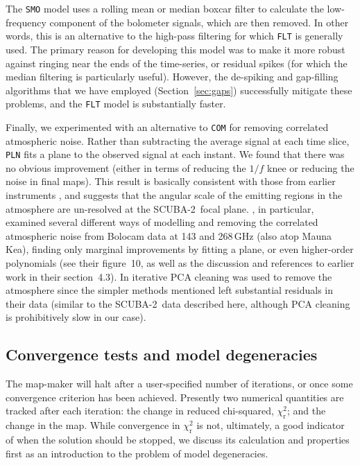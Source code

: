 \documentclass[useAMS,usenatbib,nofootinbib]{mn2e}
\newcommand{\scuba}{SCUBA-2}
\newcommand{\model}[1]{\texttt{#1}}
\begin{document}
The \model{SMO} model uses a rolling mean or median boxcar filter to
calculate the low-frequency component of the bolometer signals, which
are then removed. In other words, this is an alternative to the
high-pass filtering for which \model{FLT} is generally used. The
primary reason for developing this model was to make it more robust
against ringing near the ends of the time-series, or residual spikes
(for which the median filtering is particularly useful). However, the
de-spiking and gap-filling algorithms that we have employed
(Section~\ref{sec:gaps}) successfully mitigate these problems, and the
\model{FLT} model is substantially faster.

Finally, we experimented with an alternative to \model{COM} for
removing correlated atmospheric noise. Rather than subtracting the
average signal at each time slice, \model{PLN} fits a plane to the
observed signal at each instant. We found that there was no obvious
improvement (either in terms of reducing the $1/f$ knee or reducing
the noise in final maps). This result is basically consistent with
those from earlier instruments \citep[e.g., the prediction for \scuba\
based on SCUBA data described in][]{chapin2002}, and suggests that the
angular scale of the emitting regions in the atmosphere are
un-resolved at the \scuba\ focal plane. \citet{sayers2010}, in
particular, examined several different ways of modelling and removing
the correlated atmospheric noise from Bolocam data at 143 and 268\,GHz
(also atop Mauna Kea), finding only marginal improvements by fitting a
plane, or even higher-order polynomials (see their figure~10, as well
as the discussion and references to earlier work in their
section~4.3). In \citet{aguirre2011} iterative PCA cleaning was used
to remove the atmosphere since the simpler methods mentioned left
substantial residuals in their data (similar to the \scuba\ data
described here, although PCA cleaning is prohibitively slow in our
case).

\subsection{Convergence tests and model degeneracies}
\label{sec:converge}

The map-maker will halt after a user-specified number of iterations,
or once some convergence criterion has been achieved. Presently two
numerical quantities are tracked after each iteration: the change in
reduced chi-squared, $\chi^2_\mathrm{r}$; and the change in the
map. While convergence in $\chi^2_\mathrm{r}$ is not, ultimately, a
good indicator of when the solution should be stopped, we discuss its
calculation and properties first as an introduction to the problem of
model degeneracies.
\end{document}
